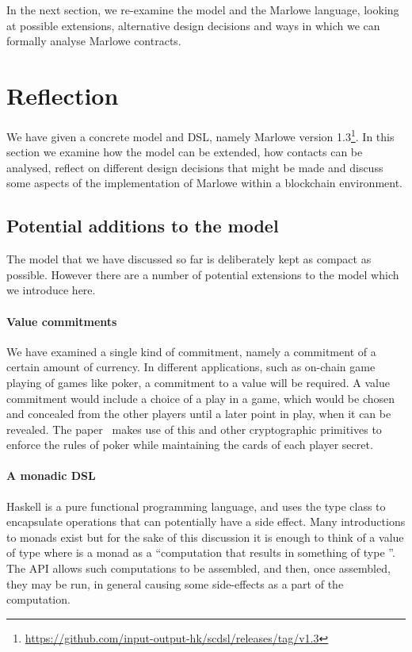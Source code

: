 \documentclass[runningheads]{llncs}
\begin{document}
In the next section, we re-examine the model and the Marlowe language, looking at possible extensions, alternative 
design decisions and ways in which we can formally analyse Marlowe contracts.

\section{Reflection}
\label{section:reflection}

We have given a concrete model and DSL, namely Marlowe version 
1.3\footnote{\url{https://github.com/input-output-hk/scdsl/releases/tag/v1.3}}.
In this section we examine how the model can be extended, how contacts can be analysed, reflect on different design 
decisions that might be made and discuss some aspects of the implementation of Marlowe within a blockchain environment.

\subsection{Potential additions to the model}

The model that we have discussed so far is deliberately kept as compact as possible. However there are a number of 
potential extensions to the model which we introduce here. 

\paragraph{Value commitments}

We have examined a single kind of commitment, namely a commitment of a certain amount of currency. In different 
applications, such as on-chain game playing of games like poker, a commitment to a value will be required. A value 
commitment would include a choice of a play in a game, which would be chosen and concealed from the other players until 
a later point in play, when it can be revealed. The paper~\cite{kumaresan2015use} makes use of this and other 
cryptographic primitives to enforce the rules of poker while maintaining the cards of each player secret.

\paragraph{A monadic DSL}

Haskell is a pure functional programming language, and uses the  type class to encapsulate
operations that can potentially have a side effect. Many introductions to monads exist \cite{wadler1990comprehending} 
but for the sake of this discussion it is enough to think of a value of type  where  
is a monad as a ``computation that results in something of type ''. The  API 
allows such computations to be assembled, and then, once assembled, they may be run, in general causing some 
side-effects as a part of the computation.
\end{document}
